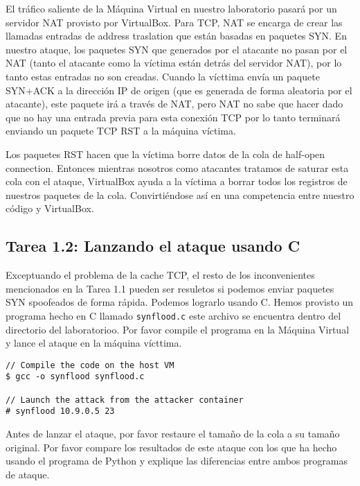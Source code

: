 El tráfico saliente de la Máquina Virtual en nuestro laboratorio pasará por un servidor NAT provisto por VirtualBox. Para TCP, NAT se encarga de crear las llamadas entradas de address traslation que están basadas en paquetes SYN.
En nuestro ataque, los paquetes SYN que generados por el atacante no pasan por el NAT (tanto el atacante como la víctima están detrás del servidor NAT), por lo tanto estas entradas no son creadas. Cuando la vícttima envía un paquete SYN+ACK a la dirección IP de origen (que es generada de forma aleatoria por el atacante), este paquete irá a través de NAT, pero NAT no sabe que hacer dado que no hay una entrada previa para esta conexión TCP por lo tanto terminará enviando un paquete TCP RST a la máquina víctima.

Los paquetes RST hacen que la víctima borre datos de la cola de half-open connection. Entonces mientras nosotros como atacantes tratamos de saturar esta cola con el ataque, VirtualBox ayuda a la víctima a borrar todos los registros de nuestros paquetes de la cola. Convirtiéndose así en una competencia entre nuestro código y VirtualBox.



\subsection{Tarea 1.2: Lanzando el ataque usando C} 

Exceptuando el problema de la cache TCP, el resto de los inconvenientes mencionados en la Tarea 1.1 pueden ser resuletos si podemos enviar paquetes SYN spoofeados de forma rápida. Podemos lograrlo usando C. Hemos provisto un programa hecho en C llamado \texttt{synflood.c} este archivo se encuentra dentro del directorio del laboratorioo. Por favor compile el programa en la Máquina Virtual y lance el ataque en la máquina vícttima.

\begin{lstlisting}
// Compile the code on the host VM
$ gcc -o synflood synflood.c

// Launch the attack from the attacker container
# synflood 10.9.0.5 23
\end{lstlisting}

Antes de lanzar el ataque, por favor restaure el tamaño de la cola a su tamaño original. Por favor compare los resultados de este ataque con los que ha hecho usando el programa de Python y explique las diferencias entre ambos programas de ataque.  


